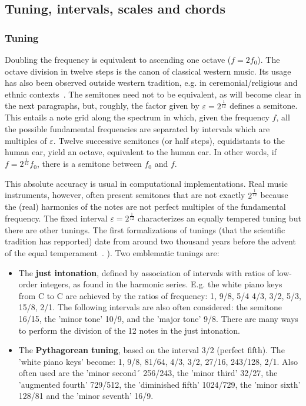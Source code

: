 \subsection{Tuning, intervals, scales and chords}\label{subsec:afinacao}
\subsubsection{Tuning}
Doubling the frequency is equivalent to ascending one octave ($f=2f_0$). The octave division in twelve steps is the canon of classical western music. Its usage has also been observed
outside western tradition, e.g. in ceremonial/religious and ethnic contexts~\cite{Wisnick}. The semitones need not to be equivalent, as will become clear in the next paragraphs, but, roughly, the factor given by $\varepsilon=2^{\frac{1}{12}}$ defines a semitone. This entails a note grid along the spectrum in which, given the frequency $f$, all the possible fundamental frequencies are separated by intervals which are multiples of $\varepsilon$. Twelve successive semitones (or half steps), equidistants to the human ear, yield an
octave, equivalent to the human ear. In other words, if $f=2^{\frac{1}{12}}f_0$, there is a semitone between
$f_0$ and $f$.

This absolute accuracy is usual in computational implementations. Real music instruments, however, often present semitones that are not exactly $2^{\frac{1}{12}}$ because the (real) harmonics of the notes are not perfect multiples of the fundamental frequency. The fixed interval $\varepsilon=2^{\frac{1}{12}}$ characterizes an equally tempered tuning but there are other tunings. The first formalizations of tunings (that the scientific tradition has repported) date from around two thousand years before the advent of the equal temperament~\cite{Roederer}.
). Two emblematic tunings are:
\begin{itemize}
    \item The {\bf just intonation}, defined by association of intervals with ratios of low-order integers, as found in the harmonic series. E.g. the white piano keys from C to C are achieved by the ratios of frequency: 1, 9/8, 5/4
    4/3, 3/2, 5/3, 15/8, 2/1. The following intervals are also often considered: the semitone 16/15, the 'minor tone' 10/9, and the 'major tone' 9/8. There are many ways to perform the division of the 12 notes in the just intonation.
    \item The {\bf Pythagorean tuning}, based on the interval 3/2 (perfect fifth). The 'white piano keys' become: 1, 9/8, 81/64, 4/3, 3/2, 27/16, 243/128, 2/1. Also often used are the 'minor second´ 256/243, the 'minor third' 32/27, the 'augmented fourth' 729/512, the 'diminished fifth' 1024/729, the 'minor sixth' 128/81 and the 'minor seventh' 16/9. 
\end{itemize}

